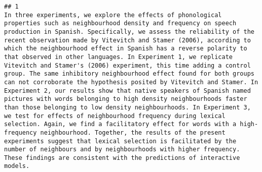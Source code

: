 \documentclass[
  english,
  man]{apa6}
\begin{document}
\begin{verbatim}
## 1                                                                                                                                                                                                                                                                                                                                                                                                                                                                                                                                                                                                                                                                                                                                                                                                                                                                                                                                                                                                                                                                                                                                                                                                                                                                                                                                                                                                                In three experiments, we explore the effects of phonological properties such as neighbourhood density and frequency on speech production in Spanish. Specifically, we assess the reliability of the recent observation made by Vitevitch and Stamer (2006), according to which the neighbourhood effect in Spanish has a reverse polarity to that observed in other languages. In Experiment 1, we replicate Vitevitch and Stamer's (2006) experiment, this time adding a control group. The same inhibitory neighbourhood effect found for both groups can not corroborate the hypothesis posited by Vitevitch and Stamer. In Experiment 2, our results show that native speakers of Spanish named pictures with words belonging to high density neighbourhoods faster than those belonging to low density neighbourhoods. In Experiment 3, we test for effects of neighbourhood frequency during lexical selection. Again, we find a facilitatory effect for words with a high-frequency neighbourhood. Together, the results of the present experiments suggest that lexical selection is facilitated by the number of neighbours and by neighbourhoods with higher frequency. These findings are consistent with the predictions of interactive models.

\end{verbatim}
\end{document}
